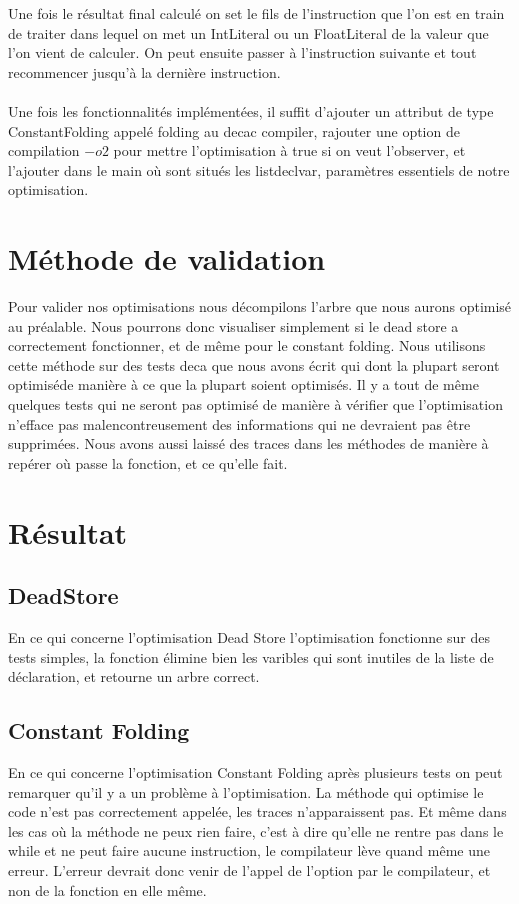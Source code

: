 \documentclass[a4paper]{article}
\begin{document}
Une fois le résultat final calculé on set le fils de l'instruction que l'on est en train de traiter dans lequel on met un IntLiteral ou un FloatLiteral de la valeur que l'on vient de calculer. On peut ensuite passer à l'instruction suivante et tout recommencer jusqu'à la dernière instruction.\\ \\
Une fois les fonctionnalités implémentées, il suffit d'ajouter un attribut de type ConstantFolding appelé folding au decac compiler, rajouter une option de compilation $-o2$ pour mettre l'optimisation à true si on veut l'observer, et l'ajouter dans le main où sont situés les listdeclvar, paramètres essentiels de notre optimisation.

\section{Méthode de validation}
Pour valider nos optimisations nous décompilons l'arbre que nous aurons optimisé au préalable. Nous pourrons donc visualiser simplement si le dead store a correctement fonctionner, et de même pour le constant folding. Nous utilisons cette méthode sur des tests deca que nous avons écrit qui dont la plupart seront optimiséde manière à ce que la plupart soient optimisés. Il y a tout de même quelques tests qui ne seront pas optimisé de manière à vérifier que l'optimisation n'efface pas malencontreusement des informations qui ne devraient pas être supprimées. Nous avons aussi laissé des traces dans les méthodes de manière à repérer où passe la fonction, et ce qu'elle fait.
\section{Résultat}
\subsection{DeadStore}
En ce qui concerne l'optimisation Dead Store l'optimisation fonctionne sur des tests simples, la fonction élimine bien les varibles qui sont inutiles de la liste de déclaration, et retourne un arbre correct.
\subsection{Constant Folding}
En ce qui concerne l'optimisation Constant Folding après plusieurs tests on peut remarquer qu'il y a un problème à l'optimisation. La méthode qui optimise le code n'est pas correctement appelée, les traces n'apparaissent pas. Et même dans les cas où la méthode ne peux rien faire, c'est à dire qu'elle ne rentre pas dans le while et ne peut faire aucune instruction, le compilateur lève quand même une erreur. L'erreur devrait donc venir de l'appel de l'option par le compilateur, et non de la fonction en elle même. 
\end{document}
